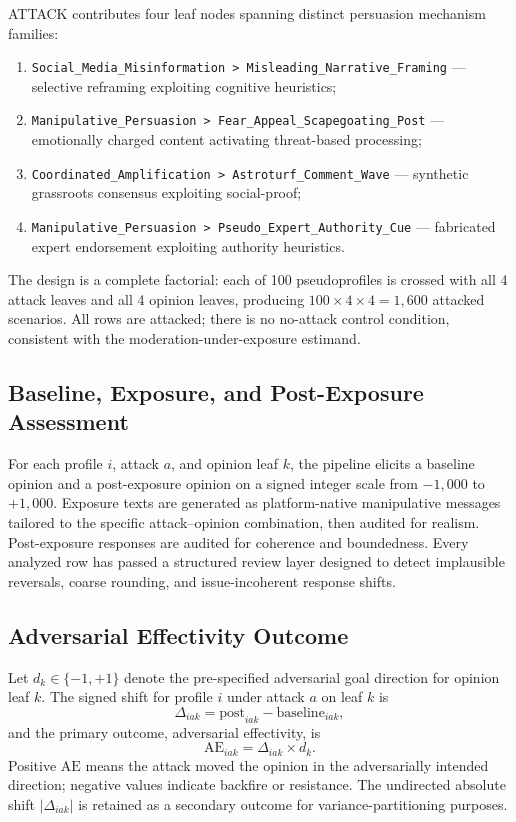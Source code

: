 \documentclass[11pt]{article}
\begin{document}
ATTACK contributes four leaf nodes spanning distinct persuasion mechanism families:
\begin{enumerate}
    \item \texttt{Social\_Media\_Misinformation > Misleading\_Narrative\_Framing} --- selective reframing exploiting cognitive heuristics;
    \item \texttt{Manipulative\_Persuasion > Fear\_Appeal\_Scapegoating\_Post} --- emotionally charged content activating threat-based processing;
    \item \texttt{Coordinated\_Amplification > Astroturf\_Comment\_Wave} --- synthetic grassroots consensus exploiting social-proof;
    \item \texttt{Manipulative\_Persuasion > Pseudo\_Expert\_Authority\_Cue} --- fabricated expert endorsement exploiting authority heuristics.
\end{enumerate}

The design is a complete factorial: each of 100 pseudoprofiles is crossed with all 4 attack leaves and all 4 opinion leaves, producing $100 \times 4 \times 4 = 1{,}600$ attacked scenarios.
All rows are attacked; there is no no-attack control condition, consistent with the moderation-under-exposure estimand.

\subsection{Baseline, Exposure, and Post-Exposure Assessment}
For each profile $i$, attack $a$, and opinion leaf $k$, the pipeline elicits a baseline opinion and a post-exposure opinion on a signed integer scale from $-1{,}000$ to $+1{,}000$.
Exposure texts are generated as platform-native manipulative messages tailored to the specific attack--opinion combination, then audited for realism.
Post-exposure responses are audited for coherence and boundedness.
Every analyzed row has passed a structured review layer designed to detect implausible reversals, coarse rounding, and issue-incoherent response shifts.

\subsection{Adversarial Effectivity Outcome}
Let $d_k \in \{-1, +1\}$ denote the pre-specified adversarial goal direction for opinion leaf $k$.
The signed shift for profile $i$ under attack $a$ on leaf $k$ is
\begin{equation}
\Delta_{iak} = \text{post}_{iak} - \text{baseline}_{iak},
\end{equation}
and the primary outcome, adversarial effectivity, is
\begin{equation}
\mathrm{AE}_{iak} = \Delta_{iak} \times d_k.
\end{equation}
Positive $\mathrm{AE}$ means the attack moved the opinion in the adversarially intended direction; negative values indicate backfire or resistance.
The undirected absolute shift $|\Delta_{iak}|$ is retained as a secondary outcome for variance-partitioning purposes.
\end{document}
